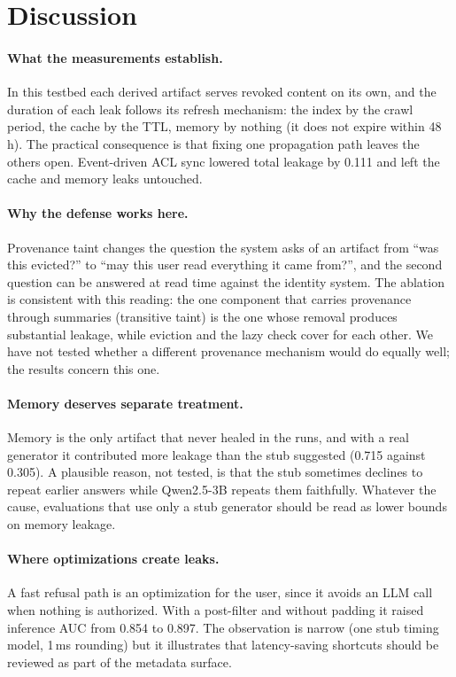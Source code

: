 \section{Discussion}
\label{sec:discussion}

\paragraph{What the measurements establish.}
In this testbed each derived artifact serves revoked content on its own, and the duration of each leak follows its refresh mechanism: the index by the crawl period, the cache by the TTL, memory by nothing (it does not expire within 48\,h). The practical consequence is that fixing one propagation path leaves the others open. Event-driven ACL sync lowered total leakage by 0.111 and left the cache and memory leaks untouched.

\paragraph{Why the defense works here.}
Provenance taint changes the question the system asks of an artifact from ``was this evicted?'' to ``may this user read everything it came from?'', and the second question can be answered at read time against the identity system. The ablation is consistent with this reading: the one component that carries provenance through summaries (transitive taint) is the one whose removal produces substantial leakage, while eviction and the lazy check cover for each other. We have not tested whether a different provenance mechanism would do equally well; the results concern this one.

\paragraph{Memory deserves separate treatment.}
Memory is the only artifact that never healed in the runs, and with a real generator it contributed more leakage than the stub suggested (0.715 against 0.305). A plausible reason, not tested, is that the stub sometimes declines to repeat earlier answers while Qwen2.5-3B repeats them faithfully. Whatever the cause, evaluations that use only a stub generator should be read as lower bounds on memory leakage.

\paragraph{Where optimizations create leaks.}
A fast refusal path is an optimization for the user, since it avoids an LLM call when nothing is authorized. With a post-filter and without padding it raised inference AUC from 0.854 to 0.897. The observation is narrow (one stub timing model, 1\,ms rounding) but it illustrates that latency-saving shortcuts should be reviewed as part of the metadata surface.


